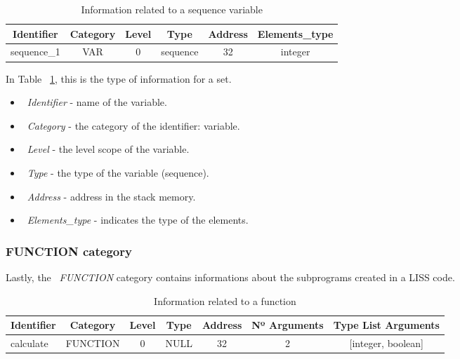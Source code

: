 \documentclass[
  oneside,
  11pt, a4paper,
  footinclude=true,
  headinclude=true,
  cleardoublepage=empty
]{scrbook}
\begin{document}
\begin{table}[h!]
\centering
\caption{Information related to a sequence variable}
\label{tbl:var_sequence_information}
\begin{tabular}{l|c|c|c|c|l}
\multicolumn{1}{c|}{Identifier} & Category & Level & Type     & Address & Elements\_type              \\ \hline
sequence\_1                     & VAR      & 0     & sequence & 32      & \multicolumn{1}{c}{integer}
\end{tabular}
\end{table}

In Table ~\ref{tbl:var_sequence_information}, this is the type of information for a set.
\begin{itemize}
\item ~\textit{Identifier} - name of the variable.
\item ~\textit{Category} - the category of the identifier: variable.
\item ~\textit{Level} - the level scope of the variable.
\item ~\textit{Type} - the type of the variable (sequence).
\item ~\textit{Address} - address in the stack memory.
\item ~\textit{Elements\_type} - indicates the type of the elements.
\end{itemize}

\subsubsection{FUNCTION category}

Lastly, the ~\textit{FUNCTION} category contains informations about the subprograms created in a LISS code.

\begin{table}[h!]
\centering
\caption{Information related to a function}
\label{tbl:function_information}
\begin{tabular}{l|c|c|c|c|c|c}
\multicolumn{1}{c|}{Identifier} & Category & Level & Type & Address & Nº Arguments & Type List Arguments    \\ \hline
calculate                       & FUNCTION & 0     & NULL & 32      & 2            & {[}integer, boolean{]}
\end{tabular}
\end{table}
\end{document}
